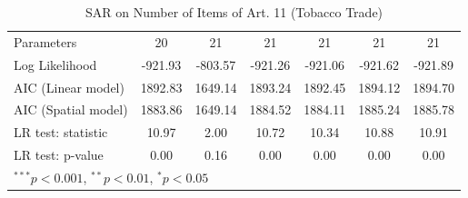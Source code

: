 \begin{table}[!h]
\begin{center}
\begin{tabular}{l c c c c c c }
Parameters              & 20           & 21           & 21           & 21           & 21           & 21           \\
Log Likelihood          & -921.93      & -803.57      & -921.26      & -921.06      & -921.62      & -921.89      \\
AIC (Linear model)      & 1892.83      & 1649.14      & 1893.24      & 1892.45      & 1894.12      & 1894.70      \\
AIC (Spatial model)     & 1883.86      & 1649.14      & 1884.52      & 1884.11      & 1885.24      & 1885.78      \\
LR test: statistic      & 10.97        & 2.00         & 10.72        & 10.34        & 10.88        & 10.91        \\
LR test: p-value        & 0.00         & 0.16         & 0.00         & 0.00         & 0.00         & 0.00         \\
\bottomrule
\multicolumn{7}{l}{\scriptsize{$^{***}p<0.001$, $^{**}p<0.01$, $^*p<0.05$}}
\end{tabular}
\caption{SAR on Number of Items of Art. 11 (Tobacco Trade)}
\label{table:coefficients}
\end{center}
\end{table}
